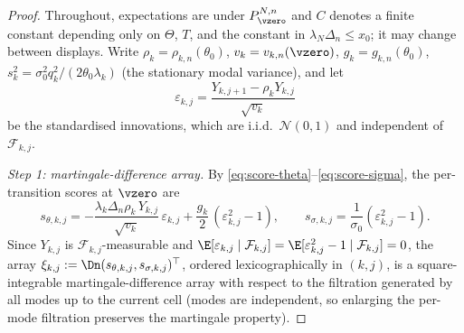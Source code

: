 \closuredraft
\begin{proof}
Throughout, expectations are under $P_{\vzero}^{N,n}$ and $C$ denotes a finite
constant depending only on $\Theta$, $T$, and the constant in
$\lambda_N\Delta_n\le x_0$; it may change between displays. Write
$\rho_k=\rho_{k,n}(\theta_0)$, $v_k=v_{k,n}(\vzero)$, $g_k=g_{k,n}(\theta_0)$,
$s_k^2=\sigma_0^2q_k^2/(2\theta_0\lambda_k)$ (the stationary modal variance),
and let
\[
 \varepsilon_{k,j}
 =\frac{Y_{k,j+1}-\rho_kY_{k,j}}{\sqrt{v_k}}
\]
be the standardised innovations, which are i.i.d.\ $\mathcal N(0,1)$ and
independent of $\mathcal F_{k,j}$.

\emph{Step 1: martingale-difference array.}
By \eqref{eq:score-theta}--\eqref{eq:score-sigma}, the per-transition scores at
$\vzero$ are
\begin{equation}\label{eq:clt-scores}
 s_{\theta,k,j}
 =-\frac{\lambda_k\Delta_n\rho_k\,Y_{k,j}}{\sqrt{v_k}}\,\varepsilon_{k,j}
 +\frac{g_k}{2}\,(\varepsilon_{k,j}^2-1),
 \qquad
 s_{\sigma,k,j}
 =\frac{1}{\sigma_0}(\varepsilon_{k,j}^2-1).
\end{equation}
Since $Y_{k,j}$ is $\mathcal F_{k,j}$-measurable and
$\E[\varepsilon_{k,j}\mid\mathcal F_{k,j}]=\E[\varepsilon_{k,j}^2-1\mid\mathcal
F_{k,j}]=0$, the array
$\xi_{k,j}:=\Dn(s_{\theta,k,j},s_{\sigma,k,j})^\top$, ordered
lexicographically in $(k,j)$, is a square-integrable martingale-difference
array with respect to the filtration generated by all modes up to the current
cell (modes are independent, so enlarging the per-mode filtration preserves
the martingale property).


\end{proof}
